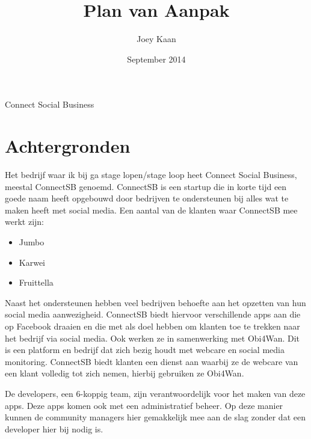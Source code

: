 \documentclass{article}
\title{Plan van Aanpak}
\author{Joey Kaan}
\date{September 2014}
\begin{document}

\begin{center}
{\huge Connect Social Business\par}
\end{center}
\thispagestyle{empty}
\clearpage



\maketitle
\thispagestyle{empty}
\clearpage



\tableofcontents
\thispagestyle{empty}
\clearpage



\section{Achtergronden}
Het bedrijf waar ik bij ga stage lopen/stage loop heet Connect Social Business, meestal ConnectSB genoemd. ConnectSB is een startup die in korte tijd een goede naam heeft opgebouwd door bedrijven te ondersteunen bij alles wat te maken heeft met social media. Een aantal van de klanten waar ConnectSB mee werkt zijn:
\begin{itemize}
\item Jumbo
\item Karwei
\item Fruittella
\end{itemize}
Naast het ondersteunen hebben veel bedrijven behoefte aan het opzetten van hun social media aanwezigheid. ConnectSB biedt hiervoor verschillende apps aan die op Facebook draaien en die met als doel hebben om klanten toe te trekken naar het bedrijf via social media. Ook werken ze in samenwerking met Obi4Wan. Dit is een platform en bedrijf dat zich bezig houdt met webcare en social media monitoring. ConnectSB biedt klanten een dienst aan waarbij ze de webcare van een klant volledig tot zich nemen, hierbij gebruiken ze Obi4Wan.

De developers, een 6-koppig team, zijn verantwoordelijk voor het maken van deze apps. Deze apps komen ook met een administratief beheer. Op deze manier kunnen de community managers hier gemakkelijk mee aan de slag zonder dat een developer hier bij nodig is. 
\end{document}
